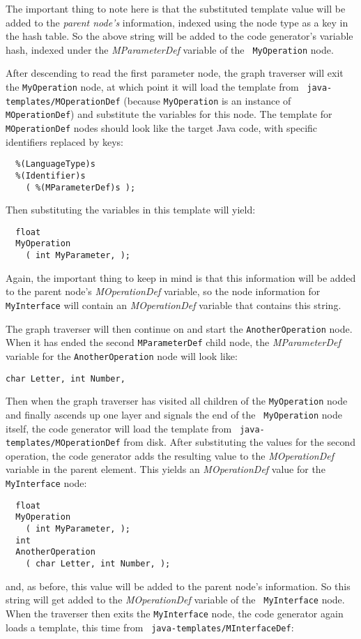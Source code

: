 The important thing to note here is that the substituted template value will be
added to the {\em parent node's\/} information, indexed using the node type as a
key in the hash table. So the above string will be added to the code generator's
variable hash, indexed under the {\it MParameterDef\/} variable of the {\tt
MyOperation} node.

After descending to read the first parameter node, the graph traverser will exit
the {\tt MyOperation} node, at which point it will load the template from {\tt
java-templates/MOperationDef} (because {\tt MyOperation} is an instance of {\tt
MOperationDef}) and substitute the variables for this node. The template for
{\tt MOperationDef} nodes should look like the target Java code, with specific
identifiers replaced by keys:
\begin{verbatim}
  %(LanguageType)s
  %(Identifier)s
    ( %(MParameterDef)s );
\end{verbatim}
Then substituting the variables in this template will yield:
\begin{verbatim}
  float
  MyOperation
    ( int MyParameter, );
\end{verbatim}
Again, the important thing to keep in mind is that this information will be
added to the parent node's {\it MOperationDef\/} variable, so the node
information for {\tt MyInterface} will contain an {\it MOperationDef\/} variable
that contains this string.

The graph traverser will then continue on and start the {\tt AnotherOperation}
node. When it has ended the second {\tt MParameterDef} child node, the {\it
MParameterDef\/} variable for the {\tt AnotherOperation} node will look like:
\begin{verbatim}
char Letter, int Number, 
\end{verbatim}
Then when the graph traverser has visited all children of the {\tt MyOperation}
node and finally ascends up one layer and signals the end of the {\tt
MyOperation} node itself, the code generator will load the template from {\tt
java-templates/MOperationDef} from disk. After substituting the values for the
second operation, the code generator adds the resulting value to the {\it
MOperationDef\/} variable in the parent element. This yields an {\it
MOperationDef\/} value for the {\tt MyInterface} node:
\begin{verbatim}
  float
  MyOperation
    ( int MyParameter, );
  int
  AnotherOperation
    ( char Letter, int Number, );
\end{verbatim}
and, as before, this value will be added to the parent node's information. So
this string will get added to the {\it MOperationDef\/} variable of the {\tt
MyInterface} node. When the traverser then exits the {\tt MyInterface} node, the
code generator again loads a template, this time from {\tt
java-templates/MInterfaceDef}:

